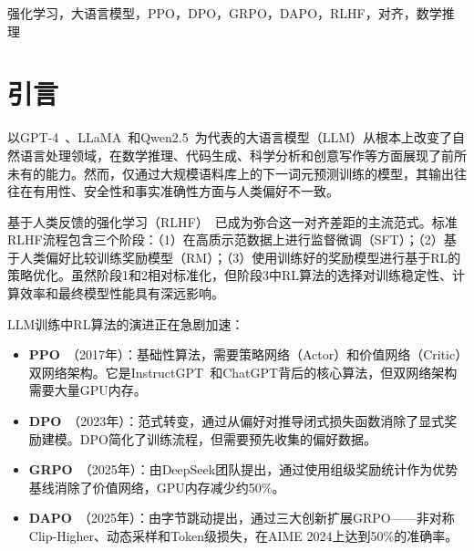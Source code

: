 \begin{abstract}
强化学习（RL）已成为对齐和增强大语言模型（LLM）的核心技术。本综述对四种主流RL算法进行了全面系统的分析：近端策略优化（PPO）、直接偏好优化（DPO）、组相对策略优化（GRPO）和动态优势策略优化（DAPO。我们为每个算法提供了严格的数学公式推导，比较了其架构设计和计算需求，并在数学推理基准（包括AIME 2024）上评估了其实证性能。分析揭示了从基于价值的方法（PPO）到基于分组的方法（GRPO/DAPO）的清晰演进轨迹。具体而言，DAPO通过三大创新——非对称Clip-Higher、动态采样和Token级损失归一化——在AIME 2024上达到50\%的准确率，较朴素GRPO实现67\%的相对提升。我们提供了实用的算法选择指南，并指出了未来研究的开放性挑战。据我们所知，这是首个在统一数学框架下对这四种算法进行并排实验评估的综述。
\end{abstract}

\begin{IEEEkeywords}
强化学习，大语言模型，PPO，DPO，GRPO，DAPO，RLHF，对齐，数学推理
\end{IEEEkeywords}

\section{引言}
\label{sec:intro}

以GPT-4~\cite{achiam2023gpt4}、LLaMA~\cite{touvron2023llama}和Qwen2.5~\cite{yang2024qwen25}为代表的大语言模型（LLM）从根本上改变了自然语言处理领域，在数学推理、代码生成、科学分析和创意写作等方面展现了前所未有的能力。然而，仅通过大规模语料库上的下一词元预测训练的模型，其输出往往在有用性、安全性和事实准确性方面与人类偏好不一致。

基于人类反馈的强化学习（RLHF）~\cite{christo2017deep, ouyang2022instructgpt}已成为弥合这一对齐差距的主流范式。标准RLHF流程包含三个阶段：（1）在高质示范数据上进行监督微调（SFT）；（2）基于人类偏好比较训练奖励模型（RM）；（3）使用训练好的奖励模型进行基于RL的策略优化。虽然阶段1和2相对标准化，但阶段3中RL算法的选择对训练稳定性、计算效率和最终模型性能具有深远影响。

LLM训练中RL算法的演进正在急剧加速：

\begin{itemize}[leftmargin=*, itemsep=2pt]
\item \textbf{PPO}~\cite{schulman2017ppo}（2017年）：基础性算法，需要策略网络（Actor）和价值网络（Critic）双网络架构。它是InstructGPT~\cite{ouyang2022instructgpt}和ChatGPT背后的核心算法，但双网络架构需要大量GPU内存。
\item \textbf{DPO}~\cite{rafailov2023dpo}（2023年）：范式转变，通过从偏好对推导闭式损失函数消除了显式奖励建模。DPO简化了训练流程，但需要预先收集的偏好数据。
\item \textbf{GRPO}~\cite{deepseek2025r1, shao2024deepseekmath}（2025年）：由DeepSeek团队提出，通过使用组级奖励统计作为优势基线消除了价值网络，GPU内存减少约50\%。
\item \textbf{DAPO}~\cite{yu2025dapo}（2025年）：由字节跳动提出，通过三大创新扩展GRPO——非对称Clip-Higher、动态采样和Token级损失，在AIME 2024上达到50\%的准确率。
\end{itemize}


